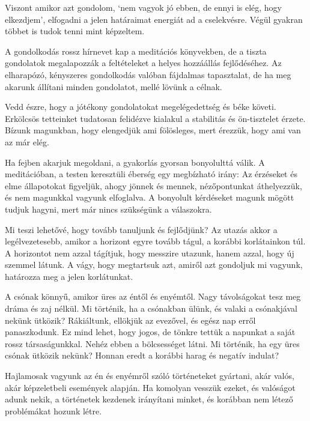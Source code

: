 
Viszont amikor azt gondolom, `nem vagyok jó ebben, de ennyi is elég,
hogy elkezdjem', elfogadni a jelen határaimat energiát ad a cselekvésre.
Végül gyakran többet is tudok tenni mint képzeltem.

A gondolkodás rossz hírnevet kap a meditációs könyvekben, de a tiszta
gondolatok megalapozzák a feltételeket a helyes hozzáállás fejlődéséhez.
Az elharapózó, kényszeres gondolkodás valóban fájdalmas tapasztalat, de
ha meg akarunk állítani minden gondolatot, mellé lövünk a célnak.

Vedd észre, hogy a jótékony gondolatokat megelégedettség és béke követi.
Erkölcsös tetteinket tudatosan felidézve kialakul a stabilitás és
ön-tisztelet érzete. Bízunk magunkban, hogy elengedjük ami fölösleges,
mert érezzük, hogy ami van az már elég.

Ha fejben akarjuk megoldani, a gyakorlás gyorsan bonyolulttá válik. A
meditációban, a testen keresztüli éberség egy megbízható irány: Az
érzéseket és elme állapotokat figyeljük, ahogy jönnek és mennek,
nézőpontunkat áthelyezzük, és nem magunkkal vagyunk elfoglalva. A
bonyolult kérdéseket magunk mögött tudjuk hagyni, mert már nincs
szükségünk a válaszokra.


Mi teszi lehetővé, hogy tovább tanuljunk és fejlődjünk? Az utazás akkor
a legélvezetesebb, amikor a horizont egyre tovább tágul, a korábbi
korlátainkon túl. A horizontot nem azzal tágítjuk, hogy messzire
utazunk, hanem azzal, hogy új szemmel látunk. A vágy, hogy megtartsuk
azt, amiről azt gondoljuk mi vagyunk, határozza meg a jelen korlátunkat.

A csónak könnyű, amikor üres az éntől és enyémtől. Nagy távolságokat
tesz meg dráma és zaj nélkül. Mi történik, ha a csónakban ülünk, és
valaki a csónakjával nekünk ütközik? Rákiáltunk, ellökjük az evezővel,
és egész nap erről panaszkodunk. Ez mind lehet, hogy jogos, de tönkre
tettük a napunkat a saját rossz társaságunkkal. Nehéz ebben a
bölcsességet látni. Mi történik, ha egy üres csónak ütközik nekünk?
Honnan eredt a korábbi harag és negatív indulat?

Hajlamosak vagyunk az én és enyémről szóló történeteket gyártani, akár
valós, akár képzeletbeli események alapján. Ha komolyan vesszük ezeket,
és valóságot adunk nekik, a történetek kezdenek irányítani minket, és
korábban nem létező problémákat hozunk létre.

\enlargethispage*{\baselineskip}

